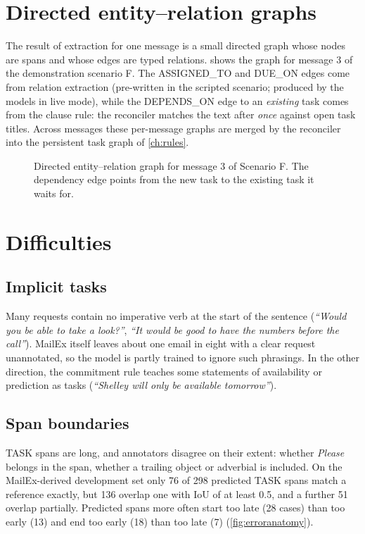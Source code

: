 \section{Directed entity--relation graphs}
The result of extraction for one message is a small directed graph whose nodes are spans and whose edges are typed relations.  shows the graph for message 3 of the demonstration scenario F. The ASSIGNED\_TO and DUE\_ON edges come from relation extraction (pre-written in the scripted scenario; produced by the models in live mode), while the DEPENDS\_ON edge to an \emph{existing} task comes from the clause rule: the reconciler matches the text after \emph{once} against open task titles. Across messages these per-message graphs are merged by the reconciler into the persistent task graph of \cref{ch:rules}.

\begin{figure}[t]
\centering
{}
\caption[Entity--relation graph for one message]{Directed entity--relation graph for message 3 of Scenario F. The dependency edge points from the new task to the existing task it waits for.}
\label{fig:egraph}
\end{figure}

\section{Difficulties}
\subsection{Implicit tasks}
Many requests contain no imperative verb at the start of the sentence (\emph{``Would you be able to take a look?''}, \emph{``It would be good to have the numbers before the call''}). MailEx itself leaves about one email in eight with a clear request unannotated, so the model is partly trained to ignore such phrasings. In the other direction, the commitment rule teaches some statements of availability or prediction as tasks (\emph{``Shelley will only be available tomorrow''}).

\subsection{Span boundaries}
TASK spans are long, and annotators disagree on their extent: whether \emph{Please} belongs in the span, whether a trailing object or adverbial is included. On the MailEx-derived development set only 76 of 298 predicted TASK spans match a reference exactly, but 136 overlap one with IoU of at least 0.5, and a further 51 overlap partially. Predicted spans more often start too late (28 cases) than too early (13) and end too early (18) than too late (7) (\cref{fig:erroranatomy}).

